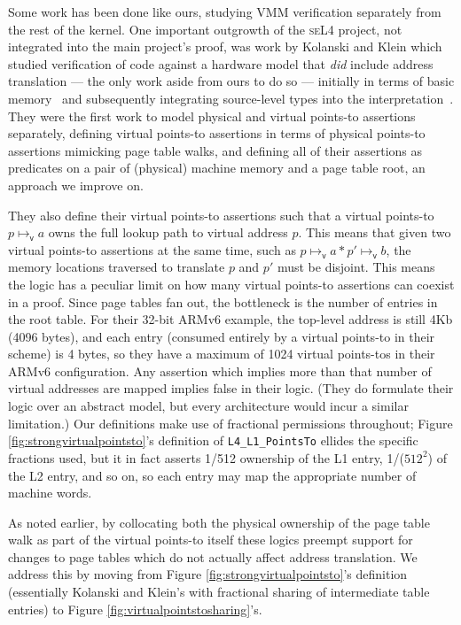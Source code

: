 Some work has been done like ours, studying VMM verification separately from the rest of the kernel.
One important outgrowth of the \textsc{seL4} project, not integrated into the main project's proof, was work by 
Kolanski and Klein which studied verification of code against a hardware model that \emph{did} include address translation
 --- the only work aside from ours to do so --- initially in terms of basic memory~\cite{kolanski08vstte} and subsequently 
integrating source-level types into the interpretation~\cite{kolanski09tphols}. 
They were the first work to model physical and virtual points-to assertions separately, defining virtual points-to assertions
in terms of physical points-to assertions mimicking page table walks, and defining all of their assertions as predicates on a
pair of (physical) machine memory and a page table root, an approach we improve on.

They also define their virtual points-to assertions such that a virtual points-to $p\mapsto_\mathsf{v} a$ owns the full 
lookup path to virtual address $p$. This means that given two virtual points-to assertions at the same time, such as 
$p\mapsto_\mathsf{v}a \ast p'\mapsto_\mathsf{v}b$, the memory locations traversed to translate $p$ and $p'$ must be disjoint. 
This means the logic has a peculiar limit on how many virtual points-to assertions can coexist in a proof. Since page tables 
fan out, the bottleneck is the number of entries in the root table. For their 32-bit ARMv6 example, the top-level address is 
still 4Kb (4096 bytes), and each entry (consumed entirely by a virtual points-to in their scheme) is 4 bytes, so they have a 
maximum of 1024 virtual points-tos in their ARMv6 configuration. Any assertion which implies more than that number
of virtual addresses are mapped implies false in their logic.
(They do formulate their logic over an abstract model, but every architecture would incur a similar limitation.)
Our definitions make use of fractional permissions throughout; Figure \ref{fig:strongvirtualpointsto}'s definition
of \lstinline|L4_L1_PointsTo| ellides the specific fractions used, but it in fact asserts 1/512 ownership of
the L1 entry, 1/($512^2$) of the L2 entry, and so on, so each entry may map the appropriate number of machine words.

As noted earlier, by collocating both the physical ownership of the page table walk
as part of the virtual points-to itself these logics preempt support for changes to page tables which do not actually affect 
address translation. We address this by moving from Figure \ref{fig:strongvirtualpointsto}'s definition (essentially Kolanski and Klein's
with fractional sharing of intermediate table entries) to Figure \ref{fig:virtualpointstosharing}'s.

